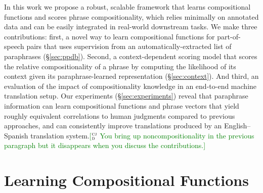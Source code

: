 \documentclass[11pt,letterpaper]{article}
\newcommand{\ensuretext}[1]{#1}
\newcommand{\clabcomment}[3]{\ensuretext{\textcolor{#3}{[#1 #2]}}}
\newcommand{\cjdmarker}{\ensuretext{\textcolor{green}{\ensuremath{^{\textsc{cj}}_{\textsc{d}}}}}}
\newcommand{\cjd}[1]{\clabcomment{\cjdmarker}{#1}{green}}
\begin{document}

In this work we propose a robust, scalable framework that learns compositional functions and scores phrase compositionality, which relies minimally on annotated data and can be easily integrated in real-world downstream tasks. 
We make three contributions: first, a novel way to learn compositional functions for part-of-speech pairs that uses supervision from an automatically-extracted list of paraphrases (\S\ref{sec:ppdb}). 
Second, a context-dependent scoring model that scores the relative compositionality of a phrase by computing the likelihood of its context given its paraphrase-learned representation (\S\ref{sec:context}). 
And third, an evaluation of the impact of compositionality knowledge in an end-to-end machine translation setup.
Our experiments (\S\ref{sec:experiments}) reveal that paraphrase information can learn compositional functions and phrase vectors that yield roughly equivalent correlations to human judgments compared to previous approaches, and can consistently improve translations produced by an English--Spanish translation system.\cjd{You bring up noncompositionality in the previous paragraph but it disappears when you discuss the contributions.}

\section{Learning Compositional Functions}
\label{sec:learning}
\end{document}
